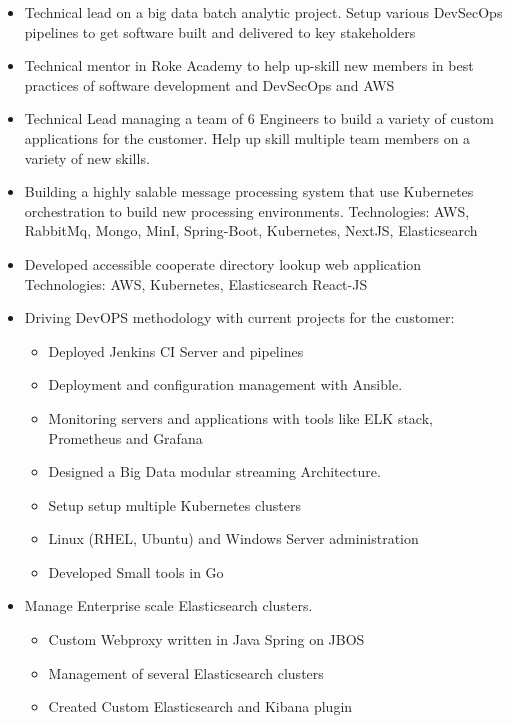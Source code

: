 \documentclass[10pt,a4paper,ragged2e,withhyper]{altacv}
\begin{document}
\begin{paracol}{2}
\divider
{}
\begin{itemize}
\item Technical lead on a big data batch analytic project. 
Setup various DevSecOps pipelines to get software built and delivered to key stakeholders
\item Technical mentor in Roke Academy to help up-skill new members in best practices of software development and DevSecOps and AWS 
\end{itemize}
\divider
{}
\begin{itemize}
    \item Technical Lead managing a team of 6 Engineers to build a variety of custom applications for the customer. Help up skill multiple team members on a variety of new skills.
    \item Building a highly salable message processing system that use Kubernetes orchestration to build new processing environments. 
    Technologies: AWS, RabbitMq, Mongo, MinI, Spring-Boot, Kubernetes, NextJS, Elasticsearch
    \item Developed accessible cooperate directory lookup web application 
    Technologies: AWS, Kubernetes, Elasticsearch React-JS
\end{itemize}


\begin{itemize}
 \item Driving DevOPS methodology with current projects for the customer:
 \begin{itemize}
     \item Deployed Jenkins CI Server and pipelines 
     \item Deployment and configuration management with Ansible.
     \item Monitoring servers and applications with tools like ELK stack, Prometheus and Grafana
     \item Designed a Big Data modular streaming Architecture. 
     \item Setup setup multiple Kubernetes clusters 
     \item Linux (RHEL, Ubuntu) and Windows Server administration
     \item Developed Small tools in Go
  \end{itemize}
  \item Manage Enterprise scale Elasticsearch clusters.
  \begin{itemize}
   \item Custom Webproxy written in Java Spring on JBOS
   \item Management of several Elasticsearch clusters
   \item Created Custom Elasticsearch and Kibana plugin 
  \end{itemize}
 \end{itemize}


\end{paracol}
\end{document}

